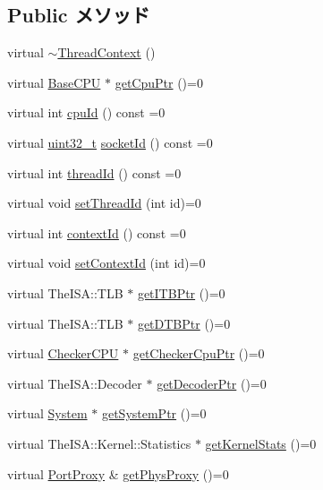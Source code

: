 \subsection*{Public メソッド}
\begin{DoxyCompactItemize}
\item 
virtual \hyperlink{classThreadContext_a23d9e505ac02c1e443ad89801260745e}{$\sim$ThreadContext} ()
\item 
virtual \hyperlink{classBaseCPU}{BaseCPU} $\ast$ \hyperlink{classThreadContext_ad10a7ef049c2d2ffadfc809341e66d4e}{getCpuPtr} ()=0
\item 
virtual int \hyperlink{classThreadContext_a7272bc1f752a9f60ab0358a09cc96f97}{cpuId} () const =0
\item 
virtual \hyperlink{Type_8hh_a435d1572bf3f880d55459d9805097f62}{uint32\_\-t} \hyperlink{classThreadContext_aba2c497e8af03f742e5ece80efaeb197}{socketId} () const =0
\item 
virtual int \hyperlink{classThreadContext_a79882224329589b18076ee3f2f45d99f}{threadId} () const =0
\item 
virtual void \hyperlink{classThreadContext_a8ab94437bf0aaa86face2bc4b2dfa138}{setThreadId} (int id)=0
\item 
virtual int \hyperlink{classThreadContext_a5a3ce3f955d2ec16ac6f2aa21e42f3a0}{contextId} () const =0
\item 
virtual void \hyperlink{classThreadContext_a60a9383e4a460807756f2de9f5215582}{setContextId} (int id)=0
\item 
virtual TheISA::TLB $\ast$ \hyperlink{classThreadContext_aaae22e0dcf2f312619915bbf34509ba4}{getITBPtr} ()=0
\item 
virtual TheISA::TLB $\ast$ \hyperlink{classThreadContext_a235a0443e22590632cfc95cd4f6db1ae}{getDTBPtr} ()=0
\item 
virtual \hyperlink{classCheckerCPU}{CheckerCPU} $\ast$ \hyperlink{classThreadContext_a78c10882b34a6238eac936f6913f9918}{getCheckerCpuPtr} ()=0
\item 
virtual TheISA::Decoder $\ast$ \hyperlink{classThreadContext_a14aa0e2adc88b9bc615f708aad02d80f}{getDecoderPtr} ()=0
\item 
virtual \hyperlink{classSystem}{System} $\ast$ \hyperlink{classThreadContext_a4585cb7174e215741001b70fafe6662e}{getSystemPtr} ()=0
\item 
virtual TheISA::Kernel::Statistics $\ast$ \hyperlink{classThreadContext_a85141770510cf256c27f10adece17ed5}{getKernelStats} ()=0
\item 
virtual \hyperlink{classPortProxy}{PortProxy} \& \hyperlink{classThreadContext_a2c278159cd0cf8983446313f71dad2b4}{getPhysProxy} ()=0

\end{DoxyCompactItemize}
